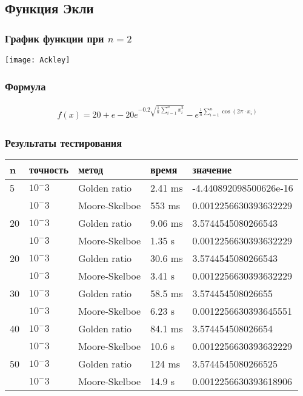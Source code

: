 \documentclass{article}
\begin{document}
    \subsection{Функция Экли}

    \subsubsection{График функции при $n=2$}
    \texttt{[image: Ackley]}

    \subsubsection{Формула}
    \begin{gather*}
        f(x)=20+e-20 e^{-0.2 \sqrt{\frac{1}{n} \sum_{i=1}^n x_i^2}}-e^{\frac{1}{n} \sum_{i=1}^n \cos \left(2 \pi \cdot x_i\right)}
    \end{gather*}

    \subsubsection{Результаты тестирования}

    \begin{tabular}{ |p{2cm}|p{2cm}|p{3cm}|p{2cm}|p{4cm}|  }
        \hline
        n  & точность & метод         & время   & значение               \\
        \hline
        5  & $10^-3$  & Golden ratio  & 2.41 ms & -4.440892098500626e-16 \\\cline{2-5}
        & $10^-3$  & Moore-Skelboe & 553 ms  & 0.0012256630393632229  \\
        \hline
        20 & $10^-3$  & Golden ratio  & 9.06 ms & 3.5744545080266543     \\\cline{2-5}
        & $10^-3$  & Moore-Skelboe & 1.35 s  & 0.0012256630393632229  \\
        \hline
        20 & $10^-3$  & Golden ratio  & 30.6 ms & 3.5744545080266543     \\\cline{2-5}
        & $10^-3$  & Moore-Skelboe & 3.41 s  & 0.0012256630393632229  \\
        \hline
        30 & $10^-3$  & Golden ratio  & 58.5 ms & 3.574454508026655      \\\cline{2-5}
        & $10^-3$  & Moore-Skelboe & 6.23 s  & 0.0012256630393645551  \\
        \hline
        40 & $10^-3$  & Golden ratio  & 84.1 ms & 3.574454508026654      \\\cline{2-5}
        & $10^-3$  & Moore-Skelboe & 10.6 s  & 0.0012256630393632229  \\
        \hline
        50 & $10^-3$  & Golden ratio  & 124 ms  & 3.5744545080266525     \\\cline{2-5}
        & $10^-3$  & Moore-Skelboe & 14.9 s  & 0.0012256630393618906  \\
        \hline

    \end{tabular}
\end{document}
